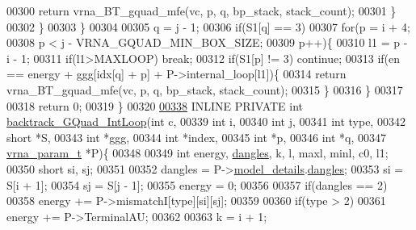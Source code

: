 \begin{DoxyCode}
00300         \textcolor{keywordflow}{return} vrna\_BT\_gquad\_mfe(vc, p, q, bp\_stack, stack\_count);
00301       \}
00302     \}
00303   \}
00304 
00305   q = j - 1;
00306   \textcolor{keywordflow}{if}(S1[q] == 3)
00307     \textcolor{keywordflow}{for}(p = i + 4;
00308         p < j - VRNA\_GQUAD\_MIN\_BOX\_SIZE;
00309         p++)\{
00310       l1    = p - i - 1;
00311       \textcolor{keywordflow}{if}(l1>MAXLOOP) \textcolor{keywordflow}{break};
00312       \textcolor{keywordflow}{if}(S1[p] != 3) \textcolor{keywordflow}{continue};
00313       \textcolor{keywordflow}{if}(en == energy + ggg[idx[q] + p] + P->internal\_loop[l1])\{
00314         \textcolor{keywordflow}{return} vrna\_BT\_gquad\_mfe(vc, p, q, bp\_stack, stack\_count);
00315       \}
00316     \}
00317 
00318   \textcolor{keywordflow}{return} 0;
00319 \}
00320 
\hypertarget{gquad_8h_source.tex_l00338}{}\hyperlink{group__gquads_ga220c41e8dbcee940ac975b8ce88e55c5}{00338} INLINE  PRIVATE \textcolor{keywordtype}{int} \hyperlink{group__gquads_ga220c41e8dbcee940ac975b8ce88e55c5}{backtrack\_GQuad\_IntLoop}(\textcolor{keywordtype}{int} c,
00339                                             \textcolor{keywordtype}{int} i,
00340                                             \textcolor{keywordtype}{int} j,
00341                                             \textcolor{keywordtype}{int} type,
00342                                             \textcolor{keywordtype}{short} *S,
00343                                             \textcolor{keywordtype}{int} *ggg,
00344                                             \textcolor{keywordtype}{int} *index,
00345                                             \textcolor{keywordtype}{int} *p,
00346                                             \textcolor{keywordtype}{int} *q,
00347                                             \hyperlink{group__energy__parameters_structvrna__param__s}{vrna\_param\_t} *P)\{
00348 
00349   \textcolor{keywordtype}{int} energy, \hyperlink{group__model__details_ga72b511ed1201f7e23ec437e468790d74}{dangles}, k, l, maxl, minl, c0, l1;
00350   \textcolor{keywordtype}{short} si, sj;
00351 
00352   dangles = P->\hyperlink{group__energy__parameters_a7b84353eb9075c595bad4ceb871bcae7}{model\_details}.\hyperlink{structvrna__md__s_adcda4ff2ea77748ae0e8700288282efc}{dangles};
00353   si      = S[i + 1];
00354   sj      = S[j - 1];
00355   energy  = 0;
00356 
00357   \textcolor{keywordflow}{if}(dangles == 2)
00358     energy += P->mismatchI[type][si][sj];
00359 
00360   \textcolor{keywordflow}{if}(type > 2)
00361     energy += P->TerminalAU;
00362 
00363   k = i + 1;

\end{DoxyCode}
